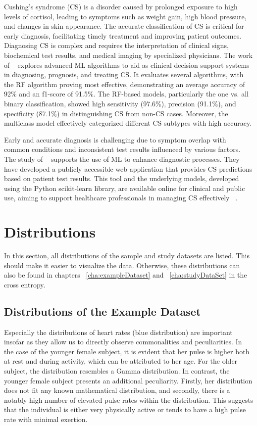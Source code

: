 Cushing's syndrome (CS) is a disorder caused by prolonged exposure to high levels of cortisol, leading to symptoms such as weight gain, high blood pressure, and changes in skin appearance. The accurate classification of CS is critical for early diagnosis, facilitating timely treatment and improving patient outcomes. Diagnosing CS is complex and requires the interpretation of clinical signs, biochemical test results, and medical imaging by specialized physicians. The work of ~\textcite{CS} explores advanced ML algorithms to aid as clinical decision support systems in diagnosing, prognosis, and treating CS. It evaluates several algorithms, with the RF algorithm proving most effective, demonstrating an average accuracy of 92$\%$ and an f1-score of 91.5$\%$. The RF-based models, particularly the one vs. all binary classification, showed high sensitivity (97.6$\%$), precision (91.1$\%$), and specificity (87.1$\%$) in distinguishing CS from non-CS cases. Moreover, the multiclass model effectively categorized different CS subtypes with high accuracy.

Early and accurate diagnosis is challenging due to symptom overlap with common conditions and inconsistent test results influenced by various factors. The study of ~\textcite{CS} supports the use of ML to enhance diagnostic processes. They have developed a publicly accessible web application that provides CS predictions based on patient test results. This tool and the underlying models, developed using the Python scikit-learn library, are available online for clinical and public use, aiming to support healthcare professionals in managing CS effectively ~\cite{CS}.

\section{Distributions}

In this section, all distributions of the sample and study datasets are listed. This should make it easier to visualize the data. Otherwise, these distributions can also be found in chapters ~\ref{cha:exampleDataset} and ~\ref{cha:studyDataSet} in the cross entropy.

\subsection{Distributions of the Example Dataset}

Especially the distributions of heart rates (blue distribution) are important insofar as they allow us to directly observe commonalities and peculiarities. In the case of the younger female subject, it is evident that her pulse is higher both at rest and during activity, which can be attributed to her age. For the older subject, the distribution resembles a Gamma distribution. In contrast, the younger female subject presents an additional peculiarity. Firstly, her distribution does not fit any known mathematical distribution, and secondly, there is a notably high number of elevated pulse rates within the distribution. This suggests that the individual is either very physically active or tends to have a high pulse rate with minimal exertion.

